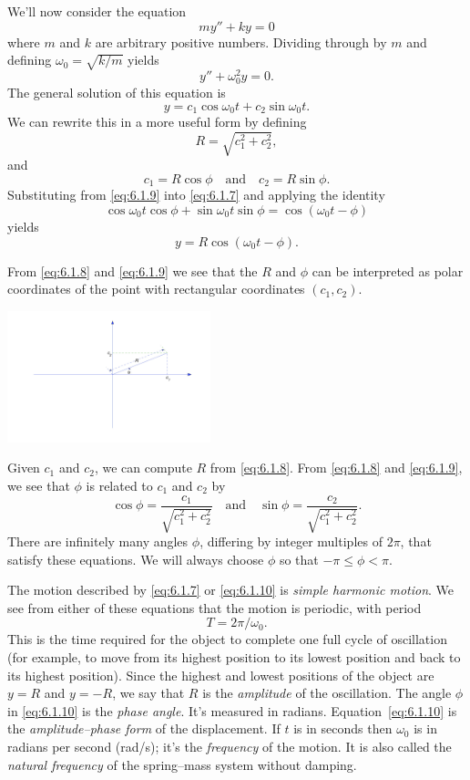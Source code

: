\documentclass{ximera}
\begin{document}
We'll now consider the equation
$$
my''+ky=0
$$
where $m$ and $k$ are arbitrary positive numbers. Dividing through by
$m$ and defining $\omega_0=\sqrt{k/m}$ yields
$$
y''+\omega_0^2y=0.
$$
The general solution of this equation is
\begin{equation}\label{eq:6.1.7}
y=c_1\cos\omega_0t+c_2\sin\omega_0t.
\end{equation}
We can rewrite this in a more useful form by defining
\begin{equation}\label{eq:6.1.8}
R=\sqrt{c_1^2+c_2^2},
\end{equation}
and
\begin{equation}\label{eq:6.1.9}
c_1=R\cos\phi\quad\mbox{and}\quad c_2=R\sin\phi.
\end{equation}
Substituting from \eqref{eq:6.1.9} into \eqref{eq:6.1.7} and applying the
identity
$$
\cos\omega_0t\cos\phi+\sin\omega_0t\sin\phi=\cos(\omega_0t-\phi)
$$
yields
\begin{equation}\label{eq:6.1.10}
y=R\cos(\omega_0t-\phi).
\end{equation}
 
From \eqref{eq:6.1.8} and \eqref{eq:6.1.9} we see that the $R$ and $\phi$
can be interpreted as polar coordinates of the point with rectangular
coordinates $(c_1,c_2)$.
 
\begin{image}
  \includegraphics[height=1.5in]{fig060105.jpg}
\end{image}
 
Given $c_1$ and
$c_2$, we can compute $R$ from \eqref{eq:6.1.8}. From \eqref{eq:6.1.8} and
\eqref{eq:6.1.9}, we see that $\phi$ is related to $c_1$ and $c_2$ by
$$
\cos\phi=\frac{c_1}{\sqrt{c_1^2+c_2^2}}\quad\mbox{and}\quad\sin\phi=
\frac{c_2}{\sqrt{c_1^2+c_2^2}}.
$$
There are infinitely many angles $\phi$, differing
 by integer multiples of $2\pi$, that satisfy these equations. We
will always choose $\phi$ so that $-\pi\leq\phi<\pi$.
 
 
The motion described by \eqref{eq:6.1.7} or \eqref{eq:6.1.10}
is  \textit{simple harmonic motion}. We see from either of these
equations that the motion is periodic, with period
$$
T=2\pi/\omega_0.
$$
This is the time required for the object to complete one full cycle of
oscillation (for example, to move from its highest position to its
lowest position and back to its highest position). Since the highest
and lowest positions of the object are $y=R$ and $y=-R$, we say that
$R$ is the \textit{amplitude} of the oscillation. The angle $\phi$ in
\eqref{eq:6.1.10} is the \textit{phase angle}. It's measured
in
radians. Equation~\eqref{eq:6.1.10} is the \textit{amplitude--phase
form} of the displacement. If $t$ is in seconds then $\omega_0$ is
in radians per second (rad/s);   it's  the \textit{frequency} of
the motion. It is also called the \textit{natural frequency} of
the spring--mass system without damping.
 
\end{document}
